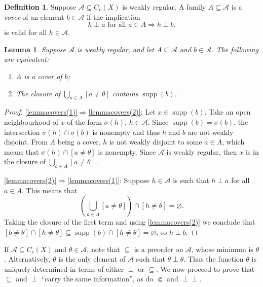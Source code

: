 \documentclass[letter,11pt]{amsart}
\theoremstyle{plain}		\newtheorem{theorem}[generalnumbering]{Theorem}
\theoremstyle{plain}		\newtheorem{corollary}[generalnumbering]{Corollary}
\theoremstyle{definition}		\newtheorem{definition}[generalnumbering]{Definition}
\theoremstyle{definition}		\newtheorem{example}[generalnumbering]{Example}
\theoremstyle{plain}		\newtheorem{proposition}[generalnumbering]{Proposition}
\theoremstyle{plain}		\newtheorem{lemma}[generalnumbering]{Lemma}
\theoremstyle{definition}
\newcommand{\perpp}{\perp\!\!\!\perp}
\DeclareMathOperator{\supp}{supp}
\begin{document}
\begin{definition}\label{definitiondisjointcover}
	Suppose $\mathcal{A}\subseteq C_c(X)$ is weakly regular. A family $A\subseteq\mathcal{A}$ is a \emph{cover} of an element $b\in\mathcal{A}$ if the implication
	\[h\perp a\text{ for all }a\in A\Longrightarrow h\perp b.\]
	is valid for all $h\in\mathcal{A}$.
\end{definition}

\begin{lemma}\label{lemmacovers}
	Suppose $\mathcal{A}$ is weakly regular, and let $A\subseteq\mathcal{A}$ and $b\in\mathcal{A}$. The following are equivalent:
	\begin{enumerate}[label=(\arabic*)]
		\item\label{lemmacovers(1)} $A$ is a cover of $b$;
		\item\label{lemmacovers(2)} The closure of $\bigcup_{a\in A}[a\neq\theta]$ contains $\supp(b)$.
	\end{enumerate}
\end{lemma}
\begin{proof}
	\ref{lemmacovers(1)}$\Rightarrow$\ref{lemmacovers(2)}: Let $x\in\supp(b)$. Take an open neighbourhood of $x$ of the form $\sigma(h)$, $h\in\mathcal{A}$. Since $\supp(b)=\overline{\sigma(b)}$, the intersection $\sigma(h)\cap\sigma(b)$ is nonempty and thus $h$ and $b$ are not weakly disjoint. From $A$ being a cover, $h$ is not weakly disjoint to some $a\in A$, which means that $\sigma(h)\cap[a\neq\theta]$ is nonempty. Since $\mathcal{A}$ is weakly regular, then $x$ is in the closure of $\bigcup_{a\in A}[a\neq\theta]$.
	
	\ref{lemmacovers(2)}$\Rightarrow$\ref{lemmacovers(1)}: Suppose $h\in\mathcal{A}$ is such that $h\perp a$ for all $a\in A$. This means that
	\[(\bigcup_{a\in A}[a\neq\theta])\cap[h\neq\theta]=\varnothing.\]
	Taking the closure of the first term and using \ref{lemmacovers(2)} we conclude that $[b\neq\theta]\cap[h\neq\theta]\subseteq\supp(b)\cap[h\neq\theta]=\varnothing$, so $h\perp b$.
\end{proof}

If $\mathcal{A}\subseteq C_c(X)$ and $\theta\in\mathcal{A}$, note that $\subseteq$ is a preorder on $\mathcal{A}$, whose minimum is $\theta$. Alternatively, $\theta$ is the only element of $\mathcal{A}$ such that $\theta\perp\theta$. Thus the function $\theta$ is uniquely determined in terms of either $\perp$ or $\subseteq$. We now proceed to prove that $\subseteq$ and $\perp$ ``carry the same information'', as do $\Subset$ and $\perpp$.
\end{document}
